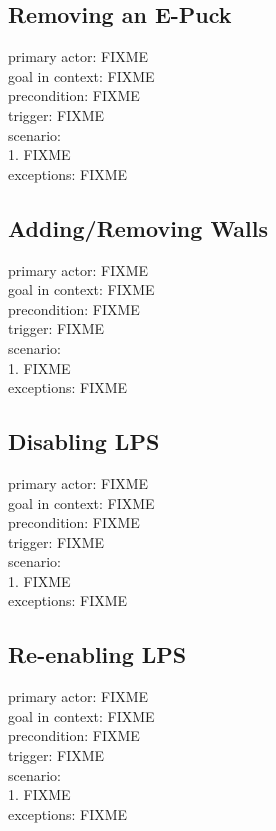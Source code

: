 \documentclass[a4paper,parskip,headheight=38pt]{scrartcl} %
\begin{document}
\subsection{Removing an E-Puck}
primary actor: FIXME \\
goal in context: FIXME \\
precondition: FIXME \\
trigger: FIXME \\
scenario: \\
1. FIXME \\
exceptions: FIXME \\

\subsection{Adding/Removing Walls}
primary actor: FIXME \\
goal in context: FIXME \\
precondition: FIXME \\
trigger: FIXME \\
scenario: \\
1. FIXME \\
exceptions: FIXME \\

\subsection{Disabling LPS}
primary actor: FIXME \\
goal in context: FIXME \\
precondition: FIXME \\
trigger: FIXME \\
scenario: \\
1. FIXME \\
exceptions: FIXME \\

\subsection{Re-enabling LPS}
primary actor: FIXME \\
goal in context: FIXME \\
precondition: FIXME \\
trigger: FIXME \\
scenario: \\
1. FIXME \\
exceptions: FIXME \\
\end{document}
